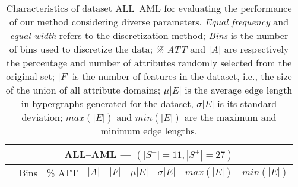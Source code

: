 \documentclass[12pt,a4paper]{article}
\begin{document}
\begin{table}
\caption
{Characteristics of dataset ALL--AML for evaluating the performance of our method considering diverse parameters.
\emph{Equal frequency} and \emph{equal width} refers to the discretization method;
\emph{Bins} is the number of bins used to discretize the data; \emph{\% ATT} and $|A|$ are respectively the percentage
and number of attributes randomly selected from the original set; $|F|$ is the number of features in the dataset, i.e., the
size of the union of all attribute domains; $\mu{|E|}$ is the average edge length in hypergraphs generated for the dataset,
$\sigma{|E|}$ is its standard deviation; $max(|E|)$ and $min(|E|)$ are the maximum and minimum edge lengths.}
\label{exp:allaml}
\begin{center}\small
\begin{tabular}{cccrrrrrr}
\hline
\multicolumn{9}{c}{\parbox{10cm}{\vspace{0.1cm}\centering \textbf{\large ALL--AML} --- $(|S^{-}|=11, |S^{+}|=27)$\vspace{0.1cm}}} \\\hline
\parbox{0.1cm}{\vspace{0.5cm}}& Bins & \% ATT & $|A|$ & $|F|$ & $\mu{|E|}$ & $\sigma{|E|}$ & $max(|E|)$ & $min(|E|)$ \\\hline


\end{tabular}
\end{center}
\end{table}
\end{document}
